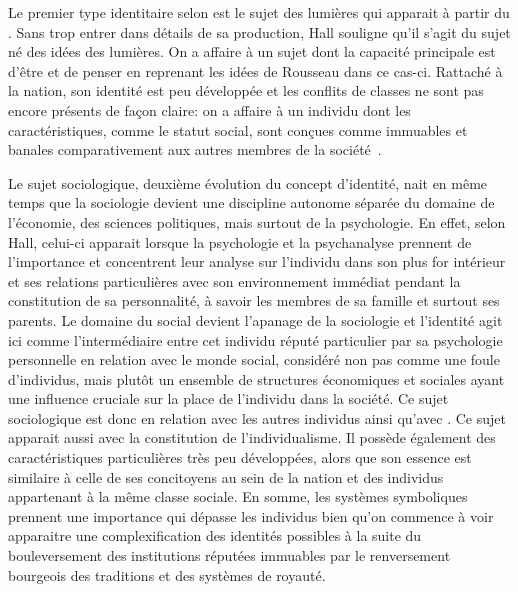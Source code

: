 Le premier type identitaire selon \citeauthor{Hall1996a} est le sujet des lumières qui apparait à partir du . 
Sans trop entrer dans détails de sa production, Hall souligne qu'il s'agit du sujet né des idées des lumières. 
On a affaire à un sujet dont la capacité principale est d'être et de penser en reprenant les idées de Rousseau dans ce cas-ci. 
Rattaché à la nation, son identité est peu développée et les conflits de classes ne sont pas encore présents de façon claire: on a affaire à un individu dont les caractéristiques, comme le statut social, sont conçues comme immuables et banales comparativement aux autres membres de la société~\citeyearpar[596]{Hall1996a}.

Le sujet sociologique, deuxième évolution du concept d'identité, nait en même temps que la sociologie devient une discipline autonome séparée du domaine de l'économie, des sciences politiques, mais surtout de la psychologie. 
En effet, selon Hall, celui-ci apparait lorsque la psychologie et la psychanalyse prennent de l'importance et concentrent leur analyse sur l'individu dans son plus for intérieur et ses relations particulières avec son environnement immédiat pendant la constitution de sa personnalité, à savoir les membres de sa famille et surtout ses parents. 
Le domaine du social devient l'apanage de la sociologie et l'identité agit ici comme l'intermédiaire entre cet individu réputé particulier par sa psychologie personnelle en relation avec le monde social, considéré non pas comme une foule d'individus, mais plutôt un ensemble de structures économiques et sociales ayant une influence cruciale sur la place de l'individu dans la société. 
Ce sujet sociologique est donc en relation avec les autres individus ainsi qu'avec . 
Ce sujet apparait aussi avec la constitution de l'individualisme. 
Il possède également des caractéristiques particulières très peu développées, alors que son essence est similaire à celle de ses concitoyens au sein de la nation et des individus appartenant à la même classe sociale. 
En somme, les systèmes symboliques prennent une importance qui dépasse les individus bien qu'on commence à voir apparaitre une complexification des identités possibles à la suite du bouleversement des institutions réputées immuables par le renversement bourgeois des traditions et des systèmes de royauté. 

